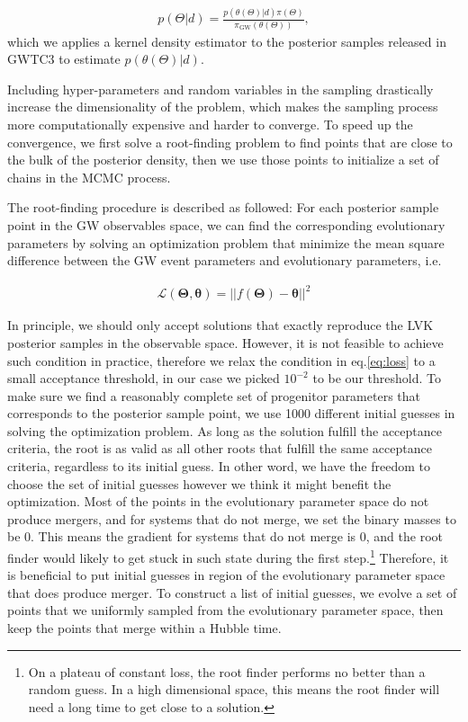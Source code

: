 \documentclass[twocolumn]{aastex631}
\begin{document}
\begin{align}
    p(\Theta | d) = \frac{p(\theta(\Theta)| d) \pi(\Theta)}{\pi_\mathrm{GW}(\theta(\Theta))},
\end{align}
which we applies a kernel density estimator to the posterior samples released in GWTC3 to estimate $p(\theta(\Theta)|d)$.

Including hyper-parameters and random variables in the sampling drastically increase the dimensionality of the problem,
which makes the sampling process more computationally expensive and harder to converge.
To speed up the convergence, we first solve a root-finding problem to find points that are close to the bulk of the posterior density,
then we use those points to initialize a set of chains in the MCMC process.

The root-finding procedure is described as followed:
For each posterior sample point in the GW observables space,
we can find the corresponding evolutionary parameters by solving an optimization problem that minimize the mean square difference between the GW event parameters and evolutionary parameters, i.e. 

\begin{align}
\mathcal{L}(\bm{\Theta},\bm{\theta}) = ||f(\bm{\Theta})-\bm{\theta}||^2
\label{eq:loss}
\end{align}

In principle, we should only accept solutions that exactly reproduce the LVK posterior samples in the observable space.
However, it is not feasible to achieve such condition in practice, therefore we relax the condition in eq.\ref{eq:loss} to a small acceptance threshold, in our case we picked $10^{-2}$ to be our threshold.
To make sure we find a reasonably complete set of progenitor parameters that corresponds to the posterior sample point, we use 1000 different initial guesses in solving the optimization problem.
As long as the solution fulfill the acceptance criteria, the root is as valid as all other roots that fulfill the same acceptance criteria, regardless to its initial guess.
In other word, we have the freedom to choose the set of initial guesses however we think it might benefit the optimization.
Most of the points in the evolutionary parameter space do not produce mergers, and for systems that do not merge, we set the binary masses to be 0.
This means the gradient for systems that do not merge is 0, and the root finder would likely to get stuck in such state during the first step.\footnote{On a plateau of constant loss, the root finder performs no better than a random guess. In a high dimensional space, this means the root finder will need a long time to get close to a solution.}
Therefore, it is beneficial to put initial guesses in region of the evolutionary parameter space that does produce merger.
To construct a list of initial guesses, we evolve a set of points that we uniformly sampled from the evolutionary parameter space, then keep the points that merge within a Hubble time.
\end{document}
